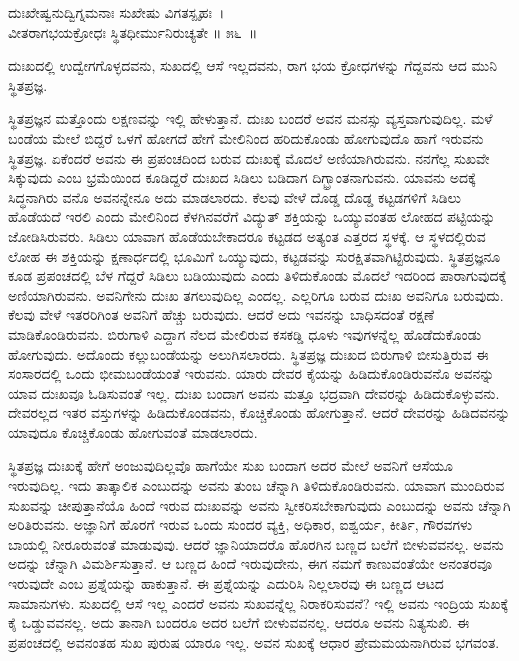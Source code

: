 \begin{shloka}
ದುಃಖೇಷ್ವನುದ್ವಿಗ್ನಮನಾಃ ಸುಖೇಷು ವಿಗತಸ್ಪೃಹಃ~।\\ವೀತರಾಗಭಯಕ್ರೋಧಃ ಸ್ಥಿತಧೀರ್ಮುನಿರುಚ್ಯತೇ \hfill॥ ೫೬~॥
\end{shloka}

\begin{artha}
ದುಃಖದಲ್ಲಿ ಉದ್ವೇಗಗೊಳ್ಳದವನು, ಸುಖದಲ್ಲಿ ಆಸೆ ಇಲ್ಲದವನು, ರಾಗ ಭಯ ಕ್ರೋಧಗಳನ್ನು ಗೆದ್ದವನು ಆದ ಮುನಿ ಸ್ಥಿತಪ್ರಜ್ಞ.
\end{artha}

ಸ್ಥಿತಪ್ರಜ್ಞನ ಮತ್ತೊಂದು ಲಕ್ಷಣವನ್ನು ಇಲ್ಲಿ ಹೇಳುತ್ತಾನೆ. ದುಃಖ ಬಂದರೆ ಅವನ ಮನಸ್ಸು ವ್ಯಸ್ತವಾಗುವುದಿಲ್ಲ. ಮಳೆ ಬಂಡೆಯ ಮೇಲೆ ಬಿದ್ದರೆ ಒಳಗೆ ಹೋಗದೆ ಹೇಗೆ ಮೇಲಿನಿಂದ ಹರಿದುಕೊಂಡು ಹೋಗುವುದೊ ಹಾಗೆ ಇರುವನು ಸ್ಥಿತಪ್ರಜ್ಞ. ಏಕೆಂದರೆ ಅವನು ಈ ಪ್ರಪಂಚದಿಂದ ಬರುವ ದುಃಖಕ್ಕೆ ಮೊದಲೆ ಅಣಿಯಾಗಿರುವನು. ನನಗೆಲ್ಲ ಸುಖವೇ ಸಿಕ್ಕುವುದು ಎಂಬ ಭ್ರಮೆಯಿಂದ ಕೂಡಿದ್ದರೆ ದುಃಖದ ಸಿಡಿಲು ಬಡಿದಾಗ ದಿಗ್ಭ್ರಾಂತನಾಗುವನು. ಯಾವನು ಅದಕ್ಕೆ ಸಿದ್ಧನಾಗಿರು ವನೊ ಅವನನ್ನೇನೂ ಅದು ಮಾಡಲಾರದು. ಕೆಲವು ವೇಳೆ ದೊಡ್ಡ ದೊಡ್ಡ ಕಟ್ಟಡಗಳಿಗೆ ಸಿಡಿಲು ಹೊಡೆಯದೆ ಇರಲಿ ಎಂದು ಮೇಲಿನಿಂದ ಕೆಳಗಿನವರೆಗೆ ವಿದ್ಯುತ್ ಶಕ್ತಿಯನ್ನು ಒಯ್ಯುವಂತಹ ಲೋಹದ ಪಟ್ಟಿಯನ್ನು ಜೋಡಿಸಿರುವರು. ಸಿಡಿಲು ಯಾವಾಗ ಹೊಡೆಯಬೇಕಾದರೂ ಕಟ್ಟಡದ ಅತ್ಯಂತ ಎತ್ತರದ ಸ್ಥಳಕ್ಕೆ. ಆ ಸ್ಥಳದಲ್ಲಿರುವ ಲೋಹ ಈ ಶಕ್ತಿಯನ್ನು ಕ್ಷಣಾರ್ಧದಲ್ಲಿ ಭೂಮಿಗೆ ಒಯ್ಯುವುದು, ಕಟ್ಟಡವನ್ನು ಸುರಕ್ಷಿತವಾಗಿಟ್ಟಿರುವುದು. ಸ್ಥಿತಪ್ರಜ್ಞನೂ ಕೂಡ ಪ್ರಪಂಚದಲ್ಲಿ ಬೆಳ ಗೆದ್ದರೆ ಸಿಡಿಲು ಬಡಿಯುವುದು ಎಂದು ತಿಳಿದುಕೊಂಡು ಮೊದಲೆ ಇದರಿಂದ ಪಾರಾಗುವುದಕ್ಕೆ ಅಣಿಯಾಗಿರುವನು. ಅವನಿಗೇನು ದುಃಖ ತಗಲುವುದಿಲ್ಲ ಎಂದಲ್ಲ. ಎಲ್ಲರಿಗೂ ಬರುವ ದುಃಖ ಅವನಿಗೂ ಬರುವುದು. ಕೆಲವು ವೇಳೆ ಇತರರಿಗಿಂತ ಅವನಿಗೆ ಹೆಚ್ಚು ಬರುವುದು. ಆದರೆ ಅದು ಇವನನ್ನು ಬಾಧಿಸದಂತೆ ರಕ್ಷಣೆ ಮಾಡಿಕೊಂಡಿರುವನು. ಬಿರುಗಾಳಿ ಎದ್ದಾಗ ನೆಲದ ಮೇಲಿರುವ ಕಸಕಡ್ಡಿ ಧೂಳು ಇವುಗಳನ್ನೆಲ್ಲ ಹೊಡೆದುಕೊಂಡು ಹೋಗುವುದು. ಅದೊಂದು ಕಲ್ಲುಬಂಡೆಯನ್ನು ಅಲುಗಿಸಲಾರದು. ಸ್ಥಿತಪ್ರಜ್ಞ ದುಃಖದ ಬಿರುಗಾಳಿ ಬೀಸುತ್ತಿರುವ ಈ ಸಂಸಾರದಲ್ಲಿ ಒಂದು ಭೀಮಬಂಡೆಯಂತೆ ಇರುವನು. ಯಾರು ದೇವರ ಕೈಯನ್ನು ಹಿಡಿದುಕೊಂಡಿರುವನೊ ಅವನನ್ನು ಯಾವ ದುಃಖವೂ ಓಡಿಸುವಂತೆ ಇಲ್ಲ. ದುಃಖ ಬಂದಾಗ ಅವನು ಮತ್ತೂ ಭದ್ರವಾಗಿ ದೇವರನ್ನು ಹಿಡಿದುಕೊಳ್ಳುವನು. ದೇವರಲ್ಲದ ಇತರ ವಸ್ತುಗಳನ್ನು ಹಿಡಿದುಕೊಂಡವನು, ಕೊಚ್ಚಿಕೊಂಡು ಹೋಗುತ್ತಾನೆ. ಆದರೆ ದೇವರನ್ನು ಹಿಡಿದವನನ್ನು ಯಾವುದೂ ಕೊಚ್ಚಿಕೊಂಡು ಹೋಗುವಂತೆ ಮಾಡಲಾರದು.

ಸ್ಥಿತಪ್ರಜ್ಞ ದುಃಖಕ್ಕೆ ಹೇಗೆ ಅಂಜುವುದಿಲ್ಲವೊ ಹಾಗೆಯೇ ಸುಖ ಬಂದಾಗ ಅದರ ಮೇಲೆ ಅವನಿಗೆ ಆಸೆಯೂ ಇರುವುದಿಲ್ಲ. ಇದು ತಾತ್ಕಾಲಿಕ ಎಂಬುದನ್ನು ಅವನು ತುಂಬ ಚೆನ್ನಾಗಿ ತಿಳಿದುಕೊಂಡಿರುವನು. ಯಾವಾಗ ಮುಂದಿರುವ ಸುಖವನ್ನು ಚೀಪುತ್ತಾನೆಯೊ ಹಿಂದೆ ಇರುವ ದುಃಖವನ್ನು ಅವನು ಸ್ವೀಕರಿಸಬೇಕಾಗುವುದು ಎಂಬುದನ್ನು ಅವನು ಚೆನ್ನಾಗಿ ಅರಿತಿರುವನು. ಅಜ್ಞಾನಿಗೆ ಹೊರಗೆ ಇರುವ ಒಂದು ಸುಂದರ ವ್ಯಕ್ತಿ, ಅಧಿಕಾರ, ಐಶ್ವರ್ಯ, ಕೀರ್ತಿ, ಗೌರವಗಳು ಬಾಯಲ್ಲಿ ನೀರೂರುವಂತೆ ಮಾಡುವುವು. ಆದರೆ ಜ್ಞಾನಿಯಾದರೊ ಹೊರಗಿನ ಬಣ್ಣದ ಬಲೆಗೆ ಬೀಳುವವನಲ್ಲ. ಅವನು ಅದನ್ನು ಚೆನ್ನಾಗಿ ವಿಮರ್ಶಿಸುತ್ತಾನೆ. ಆ ಬಣ್ಣದ ಹಿಂದೆ ಇರುವುದೇನು, ಈಗ ನಮಗೆ ಕಾಣುವಂತೆಯೇ ಅನಂತರವೂ ಇರುವುದೇ ಎಂಬ ಪ್ರಶ್ನೆಯನ್ನು ಹಾಕುತ್ತಾನೆ. ಈ ಪ್ರಶ್ನೆಯನ್ನು ಎದುರಿಸಿ ನಿಲ್ಲಲಾರವು ಈ ಬಣ್ಣದ ಆಟದ ಸಾಮಾನುಗಳು. ಸುಖದಲ್ಲಿ ಆಸೆ ಇಲ್ಲ ಎಂದರೆ ಅವನು ಸುಖವನ್ನೆಲ್ಲ ನಿರಾಕರಿಸುವನೆ? ಇಲ್ಲಿ ಅವನು ಇಂದ್ರಿಯ ಸುಖಕ್ಕೆ ಕೈ ಒಡ್ಡುವವನಲ್ಲ. ಅದು ತಾನಾಗಿ ಬಂದರೂ ಅದರ ಬಲೆಗೆ ಬೀಳುವವನಲ್ಲ. ಆದರೂ ಅವನು ನಿತ್ಯಸುಖಿ. ಈ ಪ್ರಪಂಚದಲ್ಲಿ ಅವನಂತಹ ಸುಖ ಪುರುಷ ಯಾರೂ ಇಲ್ಲ. ಅವನ ಸುಖಕ್ಕೆ ಆಧಾರ ಪ್ರೇಮಮಯನಾಗಿರುವ ಭಗವಂತ.

